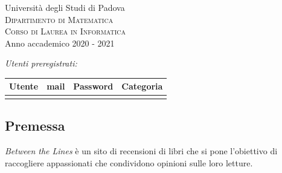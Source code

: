 \documentclass[12pt,a4paper,headings=optiontohead]{article}
\begin{document}
\begin{titlepage}
\vspace{1.5cm}
{\LARGE Università degli Studi di Padova}\\[0.4cm] %
\textsc{\large{Dipartimento di Matematica}}\\[0.05cm]
\textsc{\large{Corso di Laurea in Informatica}}\\[0.5cm]%
{\Large Anno accademico 2020 - 2021}\\ %

\vfill %



\emph{\Large{Utenti preregistrati:}}\\

\renewcommand{\arraystretch}{1.4}
 \begin{center}
 \begin{tabular}{|r|l|l|l|}
 \hline
\textbf{Utente} & \textbf{mail} & \textbf{Password} & \textbf{Categoria}  \\ \hline \hline
 &  &  & \\ \hline

 \end{tabular}
 \end{center}

\end{titlepage}


\begin{center}
\pagebreak

\section*{Premessa}
\begin{minipage}{0.9\textwidth} 
\large{\textit{Between the Lines} è un sito di recensioni di libri che si pone l'obiettivo di raccogliere appassionati che condividono opinioni sulle loro letture.}

\end{minipage}

\end{center}
\pagebreak

\tableofcontents

\end{document}
